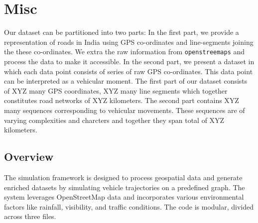\documentclass[sigplan,screen]{acmart}
\begin{document}
\section{Misc}

Our dataset can be partitioned into two parts:
In the first part, we provide a representation of roads in India
using GPS co-ordinates and line-segments joining the 
these co-ordinates.
We extra the raw information from \texttt{openstreemaps}
and process the data to make it accessible.
In the second part, we present a dataset 
in which each data point consists of series 
of raw GPS co-ordinates.
This data point can be interpreted as a vehicular moment. 
The first part of our dataset consists of XYZ many GPS coordinates,
XYZ many line segments which together constitutes road networks
of XYZ kilometers.
The second part contains XYZ many sequences corresponding
to vehicular movements.
These sequences are of varying complexities and charcters
and together they span total of XYZ kilometers. 

\subsection{Overview}
The simulation framework is designed to process geospatial data and generate enriched datasets by simulating vehicle trajectories on a predefined graph.
The system leverages OpenStreetMap data and incorporates various environmental factors like rainfall, visibility, and traffic conditions. The code is modular, divided across three files.

\begin{table}[H]
\centering
\caption{Attributes, Data Types, and Descriptions for Edges}
\label{tab:edges-attributes}
\end{table}
\end{document}
